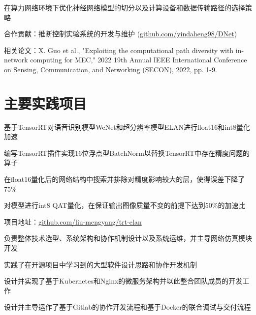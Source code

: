 \documentclass[]{deedy-resume-openfont}
\begin{document}
\begin{minipage}[t]{0.77\textwidth}
	\begin{tightemize}
		\item 在算力网络环境下优化神经网络模型的切分以及计算设备和数据传输路径的选择策略
		\item 合作贡献：推断控制实验系统的开发与维护 (\href{https://github.com/yindaheng98/DNet}{github.com/yindaheng98/DNet})
		\item 相关论文：X. Guo et al., "Exploiting the computational path diversity with in-network computing for MEC," 2022 19th Annual IEEE International Conference on Sensing, Communication, and Networking (SECON), 2022, pp. 1-9.
	\end{tightemize}
    \sectionsep


    \section{主要实践项目}
	\begin{tightemize}
		\item 基于TensorRT对语音识别模型WeNet和超分辨率模型ELAN进行float16和int8量化加速
		\item 编写TensorRT插件实现16位浮点型BatchNorm以替换TensorRT中存在精度问题的算子
		\item 在float16量化后的网络结构中搜索并排除对精度影响较大的层，使得误差下降了75\%
		\item 对模型进行int8 QAT量化，在保证输出图像质量不变的前提下达到50\%的加速比
		\item 项目地址：\href{https://github.com/liu-mengyang/trt-elan}{github.com/liu-mengyang/trt-elan}
	\end{tightemize}
	\sectionsep

	\begin{tightemize}
		\item 负责整体技术选型、系统架构和协作机制设计以及系统运维，并主导网络仿真模块开发
		\item 实践了在开源项目中学习到的大型软件设计思路和协作开发机制
		\item 设计并实现了基于Kubernetes和Nginx的微服务架构并以此整合团队成员的开发工作
		\item 设计并主导运作了基于Gitlab的协作开发流程和基于Docker的联合调试与交付流程
	\end{tightemize}
	\sectionsep


\end{minipage}
\end{document}
